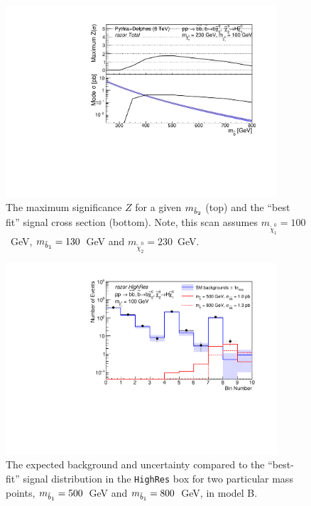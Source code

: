 \begin{figure}[htb]\centering
\includegraphics[width=0.9\textwidth]{figs/pheno/signif_T2bH_100_Total.pdf}
\caption{\label{fig:T21bH1dSignif} The maximum significance $Z$ for a
  given $m_{\tilde{b}_2}$ (top) and the ``best fit'' signal cross
  section (bottom). Note, this scan assumes
  $m_{\tilde\chi_1^0}=100$~GeV, $m_{\tilde{b}_1}=130$~GeV  and $m_{\tilde{\chi}_2^0}=230$~GeV.}
\end{figure}


\begin{figure}[htb]\centering
\includegraphics[width=0.9\textwidth]{figs/pheno/obsexp_T2bH_HighRes.pdf}
\caption{\label{fig:T2bHExpObs500800} The expected background and
  uncertainty compared to the ``best-fit'' signal distribution in the \texttt{HighRes} box for two particular
  mass points, $m_{\tilde{b}_1}=500$~GeV and $m_{\tilde{b}_1}=800$~GeV, in model B.}
\end{figure}


